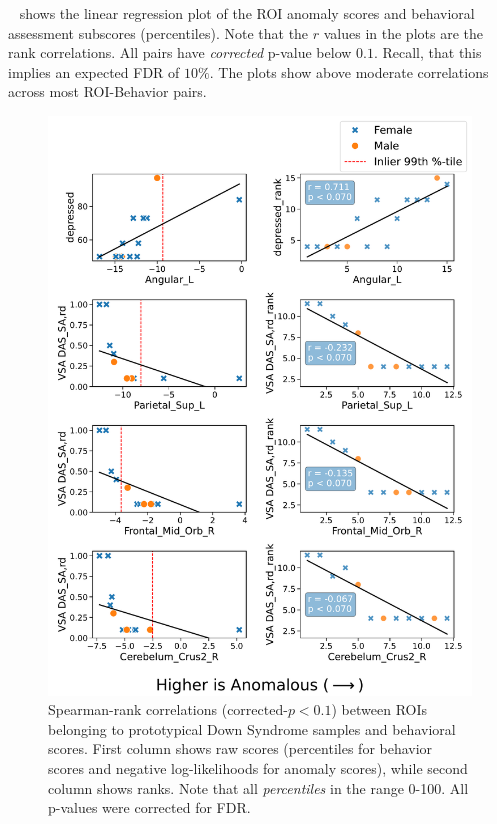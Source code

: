 ~ shows the linear regression plot of the ROI anomaly scores and behavioral assessment subscores (percentiles). Note that the $r$ values in the plots are the rank correlations. All pairs have \textit{corrected} p-value below $0.1$. Recall, that this implies an expected FDR of $10\%$. The plots show above moderate correlations across most ROI-Behavior pairs.

\begin{figure}[h!]
\centering
\includegraphics[width=\textwidth]{figures/rankcorrplot-fig1.pdf}
\caption{Spearman-rank correlations ($\text{corrected-}p < 0.1$) between ROIs belonging to prototypical Down Syndrome samples and behavioral scores.
First column shows raw scores (percentiles for behavior scores and negative log-likelihoods for anomaly scores), while second column shows ranks. Note that all \textit{percentiles} in the range 0-100. All p-values were corrected for FDR.}
\label{fig:roi-scatter}
\end{figure}

